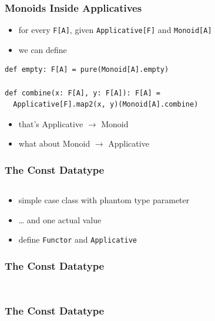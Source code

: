 \documentclass[aspectratio=169]{beamer}
\begin{document}
\begin{frame}[fragile]
  \frametitle{Monoids Inside Applicatives}
  \begin{itemize}
  \item for every \texttt{F[A]}, given \texttt{Applicative[F]} and \texttt{Monoid[A]}
  \item we can define
  \end{itemize}
  \vspace{5mm}
  \begin{verbatim}
def empty: F[A] = pure(Monoid[A].empty)

def combine(x: F[A], y: F[A]): F[A] =
  Applicative[F].map2(x, y)(Monoid[A].combine)
  \end{verbatim}
  \begin{itemize}
  \item that's Applicative $\rightarrow{}$ Monoid
  \item what about Monoid $\rightarrow{}$ Applicative
  \end{itemize}
\end{frame}

\begin{frame}[fragile]
  \frametitle{The Const Datatype}
  \begin{center}
    \inputminted[fontsize=\small]{scala}{snippets/const-def.scala}
  \end{center}
  \vspace{5mm}
  \begin{itemize}
  \item simple case class with phantom type parameter
  \item \ldots{} and one actual value
  \item define \texttt{Functor} and \texttt{Applicative}
  \end{itemize}
\end{frame}

\begin{frame}[fragile]
  \frametitle{The Const Datatype}
  \begin{center}
    \inputminted[fontsize=\small]{scala}{snippets/const-def.scala}
    \vfill
    \inputminted[fontsize=\small]{scala}{snippets/const-try-applicative.scala}
  \end{center}
\end{frame}

\begin{frame}[fragile]
  \frametitle{The Const Datatype}
  \begin{center}
    \inputminted[fontsize=\small]{scala}{snippets/const-def.scala}
    \vfill
    \inputminted[fontsize=\small, highlightlines={1,6,9}]{scala}{snippets/const-applicative.scala}
  \end{center}
\end{frame}
\end{document}
